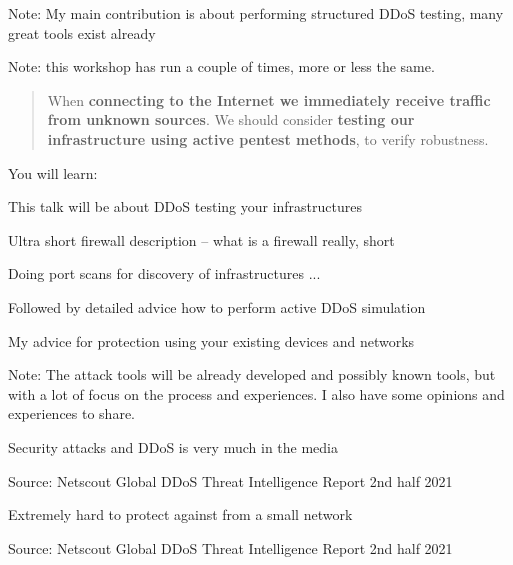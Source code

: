 \documentclass[Screen16to9,17pt]{foils}
\begin{document}
{}

{\small
Note: My main contribution is about performing structured DDoS testing, many great tools exist already}

Note: this workshop has run a couple of times, more or less the same.

\hlkprofiluk



\begin{quote}
When {\bf connecting to the Internet we immediately receive traffic from unknown sources}. We should consider {\bf testing our infrastructure using active pentest methods}, to verify robustness.
\end{quote}


You will learn:
\begin{list2}
\item This talk will be about DDoS testing your infrastructures
\item Ultra short firewall description -- what is a firewall really, short
\item Doing port scans for discovery of infrastructures ...
\item Followed by detailed advice how to perform active DDoS simulation
\item My advice for protection using your existing devices and networks
\end{list2}

Note: The attack tools will be already developed and possibly known tools, but with a lot of focus on the process and experiences. I also have some opinions and experiences to share.


Security attacks and DDoS is very much in the media

{\footnotesize Source: Netscout Global DDoS Threat Intelligence Report 2nd half 2021\\
}


Extremely hard to protect against from a small network


{\footnotesize Source: Netscout Global DDoS Threat Intelligence Report 2nd half 2021\\
}
\end{document}
